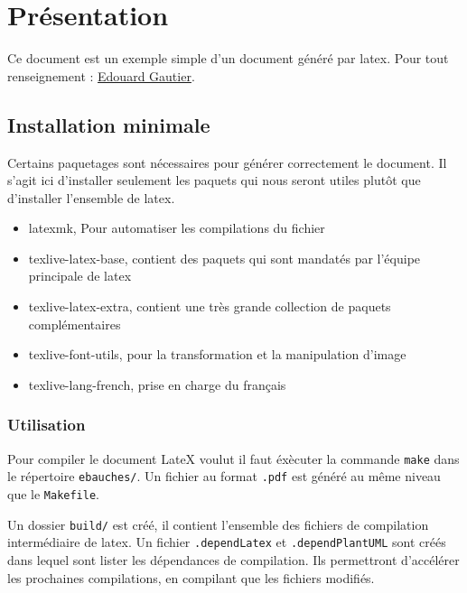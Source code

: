 \section{Présentation}
Ce document est un exemple simple d'un document généré par \gls{latex}. \newline
Pour tout renseignement : \href{mailto:edouard\_gautier@reseau.eseo.fr}{Edouard Gautier}.

\subsection{Installation minimale}
Certains paquetages sont nécessaires pour générer correctement le document.
Il s'agit ici d'installer seulement les paquets qui nous seront utiles plutôt que d'installer l'ensemble de \gls{latex}.
\begin{itemize}
    \item latexmk, Pour automatiser les compilations du fichier
    \item texlive-latex-base, contient des paquets qui sont mandatés par l'équipe principale de \gls{latex}
    \item texlive-latex-extra, contient une très grande collection de paquets complémentaires
    \item texlive-font-utils, pour la transformation et la manipulation d'image
    \item texlive-lang-french, prise en charge du français
\end{itemize}

\subsubsection{Utilisation}
Pour compiler le document LateX voulut il faut éxècuter la commande \verb=make= dans le répertoire \verb=ebauches/=.
Un fichier au format \verb=.pdf= est généré au même niveau que le \verb=Makefile=. \newline

Un dossier \verb=build/= est créé, il contient l'ensemble des fichiers de compilation intermédiaire de \gls{latex}.
Un fichier \verb=.dependLatex= et \verb=.dependPlantUML= sont créés dans lequel sont lister les dépendances de compilation.
Ils permettront d'accélérer les prochaines compilations, en compilant que les fichiers modifiés.
